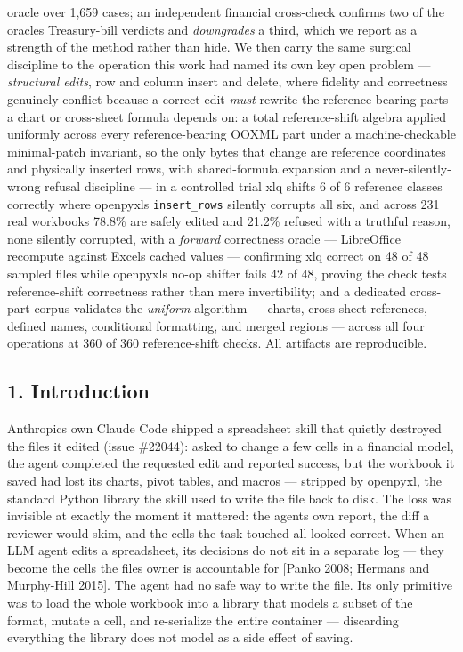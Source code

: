 \documentclass[
]{article}
\newcounter{none} %
\begin{document}
oracle over 1,659 cases; an independent financial cross-check confirms
two of the oracle\textquotesingle s Treasury-bill verdicts and
\emph{downgrades} a third, which we report as a strength of the method
rather than hide. We then carry the same surgical discipline to the
operation this work had named its own key open problem ---
\emph{structural edits}, row and column insert and delete, where
fidelity and correctness genuinely conflict because a correct edit
\emph{must} rewrite the reference-bearing parts a chart or cross-sheet
formula depends on: a total reference-shift algebra applied uniformly
across every reference-bearing OOXML part under a machine-checkable
minimal-patch invariant, so the only bytes that change are reference
coordinates and physically inserted rows, with shared-formula expansion
and a never-silently-wrong refusal discipline --- in a controlled trial
xlq shifts 6 of 6 reference classes correctly where
openpyxl\textquotesingle s \texttt{insert\_rows} silently corrupts all
six, and across 231 real workbooks 78.8\% are safely edited and 21.2\%
refused with a truthful reason, none silently corrupted, with a
\emph{forward} correctness oracle --- LibreOffice recompute against
Excel\textquotesingle s cached values --- confirming xlq correct on 48
of 48 sampled files while openpyxl\textquotesingle s no-op shifter fails
42 of 48, proving the check tests reference-shift correctness rather
than mere invertibility; and a dedicated cross-part corpus validates the
\emph{uniform} algorithm --- charts, cross-sheet references, defined
names, conditional formatting, and merged regions --- across all four
operations at 360 of 360 reference-shift checks. All artifacts are
reproducible.

\subsection{1. Introduction}\label{1-introduction}

Anthropic\textquotesingle s own Claude Code shipped a spreadsheet skill
that quietly destroyed the files it edited (issue \#22044): asked to
change a few cells in a financial model, the agent completed the
requested edit and reported success, but the workbook it saved had lost
its charts, pivot tables, and macros --- stripped by openpyxl, the
standard Python library the skill used to write the file back to disk.
The loss was invisible at exactly the moment it mattered: the
agent\textquotesingle s own report, the diff a reviewer would skim, and
the cells the task touched all looked correct. When an LLM agent edits a
spreadsheet, its decisions do not sit in a separate log --- they become
the cells the file\textquotesingle s owner is accountable for {[}Panko
2008; Hermans and Murphy-Hill 2015{]}. The agent had no safe way to
write the file. Its only primitive was to load the whole workbook into a
library that models a subset of the format, mutate a cell, and
re-serialize the entire container --- discarding everything the library
does not model as a side effect of saving.
\end{document}
